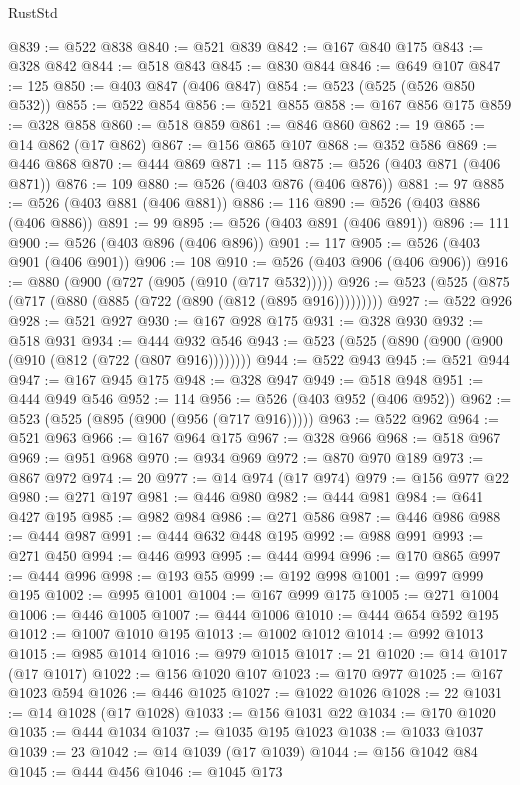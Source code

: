 \begin{lexlean}{RustStd}
\begin{coremodule}
@839 := @522 @838
@840 := @521 @839
@842 := @167 @840 @175
@843 := @328 @842
@844 := @518 @843
@845 := @830 @844
@846 := @649 @107
@847 := 125
@850 := @403 @847 (@406 @847)
@854 := @523 (@525 (@526 @850 @532))
@855 := @522 @854
@856 := @521 @855
@858 := @167 @856 @175
@859 := @328 @858
@860 := @518 @859
@861 := @846 @860
@862 := 19
@865 := @14 @862 (@17 @862)
@867 := @156 @865 @107
@868 := @352 @586
@869 := @446 @868
@870 := @444 @869
@871 := 115
@875 := @526 (@403 @871 (@406 @871))
@876 := 109
@880 := @526 (@403 @876 (@406 @876))
@881 := 97
@885 := @526 (@403 @881 (@406 @881))
@886 := 116
@890 := @526 (@403 @886 (@406 @886))
@891 := 99
@895 := @526 (@403 @891 (@406 @891))
@896 := 111
@900 := @526 (@403 @896 (@406 @896))
@901 := 117
@905 := @526 (@403 @901 (@406 @901))
@906 := 108
@910 := @526 (@403 @906 (@406 @906))
@916 := @880 (@900 (@727 (@905 (@910 (@717 @532)))))
@926 := @523 (@525 (@875 (@717 (@880 (@885 (@722 (@890 (@812 (@895 @916)))))))))
@927 := @522 @926
@928 := @521 @927
@930 := @167 @928 @175
@931 := @328 @930
@932 := @518 @931
@934 := @444 @932 @546
@943 := @523 (@525 (@890 (@900 (@900 (@910 (@812 (@722 (@807 @916))))))))
@944 := @522 @943
@945 := @521 @944
@947 := @167 @945 @175
@948 := @328 @947
@949 := @518 @948
@951 := @444 @949 @546
@952 := 114
@956 := @526 (@403 @952 (@406 @952))
@962 := @523 (@525 (@895 (@900 (@956 (@717 @916)))))
@963 := @522 @962
@964 := @521 @963
@966 := @167 @964 @175
@967 := @328 @966
@968 := @518 @967
@969 := @951 @968
@970 := @934 @969
@972 := @870 @970 @189
@973 := @867 @972
@974 := 20
@977 := @14 @974 (@17 @974)
@979 := @156 @977 @22
@980 := @271 @197
@981 := @446 @980
@982 := @444 @981
@984 := @641 @427 @195
@985 := @982 @984
@986 := @271 @586
@987 := @446 @986
@988 := @444 @987
@991 := @444 @632 @448 @195
@992 := @988 @991
@993 := @271 @450
@994 := @446 @993
@995 := @444 @994
@996 := @170 @865
@997 := @444 @996
@998 := @193 @55
@999 := @192 @998
@1001 := @997 @999 @195
@1002 := @995 @1001
@1004 := @167 @999 @175
@1005 := @271 @1004
@1006 := @446 @1005
@1007 := @444 @1006
@1010 := @444 @654 @592 @195
@1012 := @1007 @1010 @195
@1013 := @1002 @1012
@1014 := @992 @1013
@1015 := @985 @1014
@1016 := @979 @1015
@1017 := 21
@1020 := @14 @1017 (@17 @1017)
@1022 := @156 @1020 @107
@1023 := @170 @977
@1025 := @167 @1023 @594
@1026 := @446 @1025
@1027 := @1022 @1026
@1028 := 22
@1031 := @14 @1028 (@17 @1028)
@1033 := @156 @1031 @22
@1034 := @170 @1020
@1035 := @444 @1034
@1037 := @1035 @195 @1023
@1038 := @1033 @1037
@1039 := 23
@1042 := @14 @1039 (@17 @1039)
@1044 := @156 @1042 @84
@1045 := @444 @456
@1046 := @1045 @173

\end{coremodule}
\end{lexlean}
